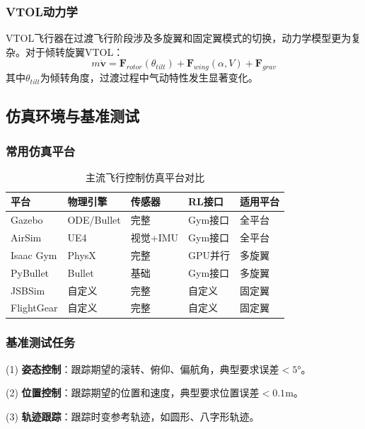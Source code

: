 \documentclass[12pt,a4paper]{ctexart}
\begin{document}
\subsubsection{VTOL动力学}

VTOL飞行器在过渡飞行阶段涉及多旋翼和固定翼模式的切换，动力学模型更为复杂。对于倾转旋翼VTOL：
\begin{equation}
    m\dot{\mathbf{v}} = \mathbf{F}_{rotor}(\theta_{tilt}) + \mathbf{F}_{wing}(\alpha, V) + \mathbf{F}_{grav}
\end{equation}
其中$\theta_{tilt}$为倾转角度，过渡过程中气动特性发生显著变化。

\subsection{仿真环境与基准测试}

\subsubsection{常用仿真平台}

\begin{table}[htbp]
\centering
\caption{主流飞行控制仿真平台对比}\label{tab:sim_platforms}
\begin{tabular}{@{}lllll@{}}
\toprule
\textbf{平台} & \textbf{物理引擎} & \textbf{传感器} & \textbf{RL接口} & \textbf{适用平台} \\
\midrule
Gazebo & ODE/Bullet & 完整 & Gym接口 & 全平台 \\
AirSim & UE4 & 视觉+IMU & Gym接口 & 全平台 \\
Isaac Gym & PhysX & 完整 & GPU并行 & 多旋翼 \\
PyBullet & Bullet & 基础 & Gym接口 & 多旋翼 \\
JSBSim & 自定义 & 完整 & 自定义 & 固定翼 \\
FlightGear & 自定义 & 完整 & 自定义 & 固定翼 \\
\bottomrule
\end{tabular}
\end{table}

\subsubsection{基准测试任务}

(1) \textbf{姿态控制}：跟踪期望的滚转、俯仰、偏航角，典型要求误差$<5°$。

(2) \textbf{位置控制}：跟踪期望的位置和速度，典型要求位置误差$<0.1$m。

(3) \textbf{轨迹跟踪}：跟踪时变参考轨迹，如圆形、八字形轨迹。
\end{document}
